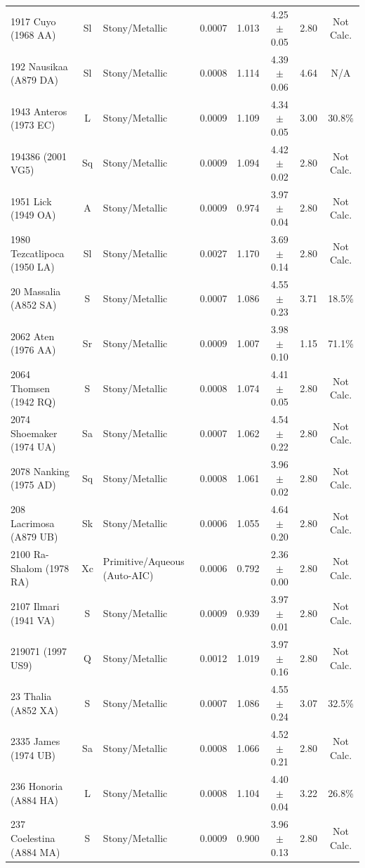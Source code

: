 {\begin{longtable}{p{2.6cm} c p{2.2cm} c c c c c}
1917 Cuyo (1968 AA) & Sl & Stony/Metallic & 0.0007 & 1.013 & 4.25 $\pm$ 0.05 & 2.80 & Not Calc. \\
192 Nausikaa (A879 DA) & Sl & Stony/Metallic & 0.0008 & 1.114 & 4.39 $\pm$ 0.06 & 4.64 & N/A \\
1943 Anteros (1973 EC) & L & Stony/Metallic & 0.0009 & 1.109 & 4.34 $\pm$ 0.05 & 3.00 & 30.8\% \\
194386 (2001 VG5) & Sq & Stony/Metallic & 0.0009 & 1.094 & 4.42 $\pm$ 0.02 & 2.80 & Not Calc. \\
1951 Lick (1949 OA) & A & Stony/Metallic & 0.0009 & 0.974 & 3.97 $\pm$ 0.04 & 2.80 & Not Calc. \\
1980 Tezcatlipoca (1950 LA) & Sl & Stony/Metallic & 0.0027 & 1.170 & 3.69 $\pm$ 0.14 & 2.80 & Not Calc. \\
20 Massalia (A852 SA) & S & Stony/Metallic & 0.0007 & 1.086 & 4.55 $\pm$ 0.23 & 3.71 & 18.5\% \\
2062 Aten (1976 AA) & Sr & Stony/Metallic & 0.0009 & 1.007 & 3.98 $\pm$ 0.10 & 1.15 & 71.1\% \\
2064 Thomsen (1942 RQ) & S & Stony/Metallic & 0.0008 & 1.074 & 4.41 $\pm$ 0.05 & 2.80 & Not Calc. \\
2074 Shoemaker (1974 UA) & Sa & Stony/Metallic & 0.0007 & 1.062 & 4.54 $\pm$ 0.22 & 2.80 & Not Calc. \\
2078 Nanking (1975 AD) & Sq & Stony/Metallic & 0.0008 & 1.061 & 3.96 $\pm$ 0.02 & 2.80 & Not Calc. \\
208 Lacrimosa (A879 UB) & Sk & Stony/Metallic & 0.0006 & 1.055 & 4.64 $\pm$ 0.20 & 2.80 & Not Calc. \\
2100 Ra-Shalom (1978 RA) & Xc & Primitive/Aqueous (Auto-AIC) & 0.0006 & 0.792 & 2.36 $\pm$ 0.00 & 2.80 & Not Calc. \\
2107 Ilmari (1941 VA) & S & Stony/Metallic & 0.0009 & 0.939 & 3.97 $\pm$ 0.01 & 2.80 & Not Calc. \\
219071 (1997 US9) & Q & Stony/Metallic & 0.0012 & 1.019 & 3.97 $\pm$ 0.16 & 2.80 & Not Calc. \\
23 Thalia (A852 XA) & S & Stony/Metallic & 0.0007 & 1.086 & 4.55 $\pm$ 0.24 & 3.07 & 32.5\% \\
2335 James (1974 UB) & Sa & Stony/Metallic & 0.0008 & 1.066 & 4.52 $\pm$ 0.21 & 2.80 & Not Calc. \\
236 Honoria (A884 HA) & L & Stony/Metallic & 0.0008 & 1.104 & 4.40 $\pm$ 0.04 & 3.22 & 26.8\% \\
237 Coelestina (A884 MA) & S & Stony/Metallic & 0.0009 & 0.900 & 3.96 $\pm$ 0.13 & 2.80 & Not Calc. \\

\end{longtable}}

